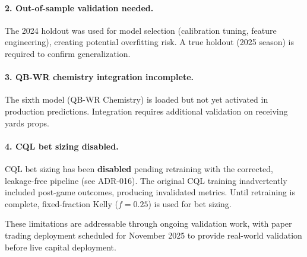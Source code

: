 \paragraph{2. Out-of-sample validation needed.}
The 2024 holdout was used for model selection (calibration tuning, feature engineering), creating potential overfitting risk. A true holdout (2025 season) is required to confirm generalization.

\paragraph{3. QB-WR chemistry integration incomplete.}
The sixth model (QB-WR Chemistry) is loaded but not yet activated in production predictions. Integration requires additional validation on receiving yards props.

\paragraph{4. CQL bet sizing disabled.}
CQL bet sizing has been \textbf{disabled} pending retraining with the corrected, leakage-free pipeline (see ADR-016). The original CQL training inadvertently included post-game outcomes, producing invalidated metrics. Until retraining is complete, fixed-fraction Kelly ($f=0.25$) is used for bet sizing.

These limitations are addressable through ongoing validation work, with paper trading deployment scheduled for November 2025 to provide real-world validation before live capital deployment.
